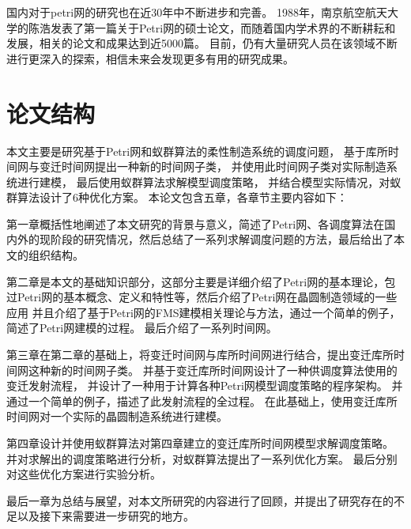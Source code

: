 国内对于petri网的研究也在近30年中不断进步和完善。
1988年，南京航空航天大学的陈浩发表了第一篇关于Petri网的硕士论文，而随着国内学术界的不断耕耘和发展，相关的论文和成果达到近5000篇。
目前，仍有大量研究人员在该领域不断进行更深入的探索，相信未来会发现更多有用的研究成果。


\section{论文结构}
本文主要是研究基于Petri网和蚁群算法的柔性制造系统的调度问题，
基于库所时间网与变迁时间网提出一种新的时间网子类，
并使用此时间网子类对实际制造系统进行建模，
最后使用蚁群算法求解模型调度策略，
并结合模型实际情况，对蚁群算法设计了6种优化方案。
本论文包含五章，各章节主要内容如下：

第一章概括性地阐述了本文研究的背景与意义，简述了Petri网、各调度算法在国内外的现阶段的研究情况，然后总结了一系列求解调度问题的方法，最后给出了本文的组织结构。

第二章是本文的基础知识部分，这部分主要是详细介绍了Petri网的基本理论，包过Petri网的基本概念、定义和特性等，然后介绍了Petri网在晶圆制造领域的一些应用
并且介绍了基于Petri网的FMS建模相关理论与方法，通过一个简单的例子，简述了Petri网建模的过程。
最后介绍了一系列时间网。

第三章在第二章的基础上，将变迁时间网与库所时间网进行结合，提出变迁库所时间网这种新的时间网子类。
并基于变迁库所时间网设计了一种供调度算法使用的变迁发射流程，
并设计了一种用于计算各种Petri网模型调度策略的程序架构。
并通过一个简单的例子，描述了此发射流程的全过程。
在此基础上，使用变迁库所时间网对一个实际的晶圆制造系统进行建模。

第四章设计并使用蚁群算法对第四章建立的变迁库所时间网模型求解调度策略。
并对求解出的调度策略进行分析，对蚁群算法提出了一系列优化方案。
最后分别对这些优化方案进行实验分析。

最后一章为总结与展望，对本文所研究的内容进行了回顾，并提出了研究存在的不足以及接下来需要进一步研究的地方。